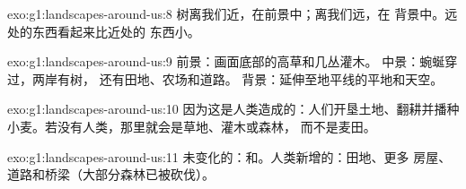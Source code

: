 \begin{solution}{exo:g1:landscapes-around-us:8}
树离我们近，在前景中；离我们远，在
背景中。远处的东西看起来比近处的
东西小。
\end{solution}

\begin{solution}{exo:g1:landscapes-around-us:9}
前景：画面底部的高草和几丛灌木。
中景：蜿蜒穿过，两岸有树，
还有田地、农场和道路。
背景：延伸至地平线的平地和天空。
\end{solution}

\begin{solution}{exo:g1:landscapes-around-us:10}
因为这是人类造成的：人们开垦土地、翻耕并播种
小麦。若没有人类，那里就会是草地、灌木或森林，
而不是麦田。
\end{solution}

\begin{solution}{exo:g1:landscapes-around-us:11}
未变化的：和。人类新增的：田地、更多
房屋、道路和桥梁（大部分森林已被砍伐）。
\end{solution}
